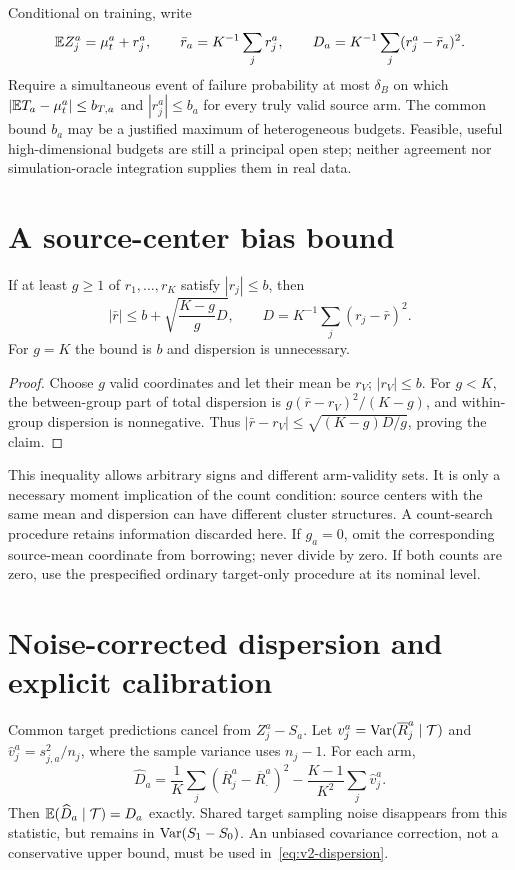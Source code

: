 Conditional on training, write
\[
 \mathbb E Z_j^a=\mu_t^a+r_j^a,\qquad
 \bar r_a=K^{-1}\sum_j r_j^a,\qquad
 D_a=K^{-1}\sum_j(r_j^a-\bar r_a)^2.
\]
Require a simultaneous event of failure probability at most $\delta_B$
on which $|\mathbb E T_a-\mu_t^a|\le b_{T,a}$ and $|r_j^a|\le b_a$ for
every truly valid source arm. The common bound $b_a$ may be a justified
maximum of heterogeneous budgets. Feasible, useful high-dimensional budgets
are still a principal open step; neither agreement nor simulation-oracle
integration supplies them in real data.

\section{A source-center bias bound}

\begin{proposition}\label{prop:v2-geometry}
If at least $g\ge1$ of $r_1,\ldots,r_K$ satisfy $|r_j|\le b$, then
\[
 |\bar r|\le b+\sqrt{\frac{K-g}{g}D},\qquad
 D=K^{-1}\sum_j(r_j-\bar r)^2.
 \tag{G}\label{eq:v2-geometry}
\]
For $g=K$ the bound is $b$ and dispersion is unnecessary.
\end{proposition}
\begin{proof}
Choose $g$ valid coordinates and let their mean be $r_V$; $|r_V|\le b$.
For $g<K$, the between-group part of total dispersion is
$g(\bar r-r_V)^2/(K-g)$, and within-group dispersion is nonnegative.
Thus $|\bar r-r_V|\le\sqrt{(K-g)D/g}$, proving the claim.
\end{proof}

This inequality allows arbitrary signs and different arm-validity sets.
It is only a necessary moment implication of the count condition: source
centers with the same mean and dispersion can have different cluster
structures. A count-search procedure retains information discarded here.
If $g_a=0$, omit the corresponding source-mean coordinate from borrowing;
never divide by zero. If both counts are zero, use the prespecified ordinary
target-only procedure at its nominal level.

\section{Noise-corrected dispersion and explicit calibration}

Common target predictions cancel from $Z_j^a-S_a$. Let
$v_j^a=\operatorname{Var}(\overline R_j^a\mid\mathcal T)$ and
$\widehat v_j^a=s_{j,a}^2/n_j$, where the sample variance uses $n_j-1$.
For each arm,
\begin{equation}
 \widehat D_a=\frac1K\sum_j(\overline R_j^a-\overline R_\cdot^a)^2
       -\frac{K-1}{K^2}\sum_j\widehat v_j^a.
 \label{eq:v2-dispersion}
\end{equation}
Then $\mathbb E(\widehat D_a\mid\mathcal T)=D_a$ exactly. Shared target sampling noise
disappears from this statistic, but remains in $\operatorname{Var}(S_1-S_0)$.
An unbiased covariance correction, not a conservative upper bound, must be
used in~\eqref{eq:v2-dispersion}.

